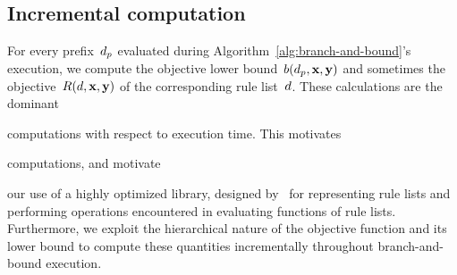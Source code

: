 \begin{arxiv}
\subsection{Incremental computation}
\label{sec:incremental}
\end{arxiv}

For every prefix~$d_p$ evaluated during
Algorithm~\ref{alg:branch-and-bound}'s execution, we compute
the objective lower bound~${b(d_p, \mathbf{x}, \mathbf{y})}$ and sometimes
the objective~${R({d}, \mathbf{x}, \mathbf{y})}$ of the corresponding rule list~${d}$.
%
These calculations are the dominant
\begin{arxiv}
computations with respect to execution time.
%
This motivates
\end{arxiv}
\begin{kdd}
computations, and motivate
\end{kdd}
our use of a highly optimized library,
designed by~\citet{YangRuSe16} for representing rule lists and
performing operations encountered in evaluating functions of rule lists.
%
Furthermore, we exploit the hierarchical nature of the objective
function and its lower bound to compute these quantities
incrementally throughout branch-and-bound execution.
%
